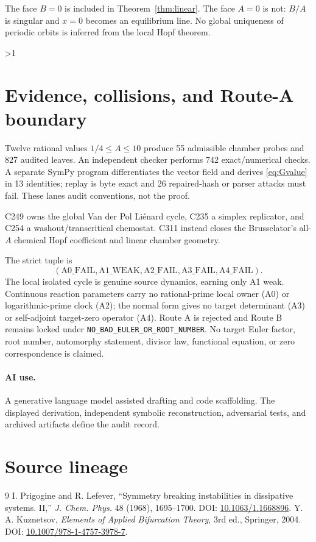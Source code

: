 \documentclass[10pt]{article}
\providecommand{\CRevisionRound}{2}
\begin{document}
The face $B=0$ is included in Theorem~\ref{thm:linear}.  The face $A=0$ is
not: $B/A$ is singular and $x=0$ becomes an equilibrium line.  No global
uniqueness of periodic orbits is inferred from the local Hopf theorem.
\fi

\ifnum\CRevisionRound>1
\section{Evidence, collisions, and Route-A boundary}
Twelve rational values $1/4\le A\le10$ produce 55 admissible chamber probes
and 827 audited leaves.  An independent checker performs 742 exact/numerical
checks.  A separate SymPy program differentiates the vector field and derives
\eqref{eq:Gvalue} in 13 identities; replay is byte exact and 26 repaired-hash
or parser attacks must fail.  These lanes audit conventions, not the proof.

C249 owns the global Van der Pol Li\'enard cycle, C235 a simplex replicator,
and C254 a washout/transcritical chemostat.  C311 instead closes the
Brusselator's all-$A$ chemical Hopf coefficient and linear chamber geometry.

The strict tuple is
\[
(\mathrm{A0\_FAIL},\mathrm{A1\_WEAK},\mathrm{A2\_FAIL},
 \mathrm{A3\_FAIL},\mathrm{A4\_FAIL}).
\]
The local isolated cycle is genuine source dynamics, earning only A1 weak.
Continuous reaction parameters carry no rational-prime local owner (A0) or
logarithmic-prime clock (A2); the normal form gives no target determinant
(A3) or self-adjoint target-zero operator (A4).  Route A is rejected and
Route B remains locked under \texttt{NO\_BAD\_EULER\_OR\_ROOT\_NUMBER}.
No target Euler factor, root number, automorphy statement, divisor law,
functional equation, or zero correspondence is claimed.

\paragraph{AI use.} A generative language model assisted drafting and code
scaffolding.  The displayed derivation, independent symbolic reconstruction,
adversarial tests, and archived artifacts define the audit record.
\fi

\section*{Source lineage}
\begin{thebibliography}{9}
 I. Prigogine and R. Lefever,
``Symmetry breaking instabilities in dissipative systems. II,''
\emph{J. Chem. Phys.} 48 (1968), 1695--1700.
DOI: \href{https://doi.org/10.1063/1.1668896}{10.1063/1.1668896}.
 Y. A. Kuznetsov,
\emph{Elements of Applied Bifurcation Theory}, 3rd ed., Springer, 2004.
DOI: \href{https://doi.org/10.1007/978-1-4757-3978-7}{10.1007/978-1-4757-3978-7}.
\end{thebibliography}
\end{document}
